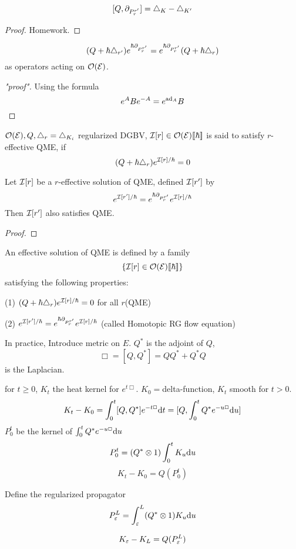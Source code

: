 \begin{lemma}
$$[Q,\partial_{P_r^{r'}}]=\triangle_{K}-\triangle_{K'}$$
\end{lemma}
\begin{proof}
Homework.
\end{proof}

\begin{cor}
$$(Q+\hbar\triangle_{r'})e^{\hbar\partial_{P_r^{r'}}}
=e^{\hbar\partial_{P^{r'}_r}}(Q+\hbar\triangle_r)
$$
as operators acting on $\mathcal{O}(\mathcal{E})$.
\end{cor}
\begin{proof}["proof"]
Using the formula
$$e^ABe^{-A}=e^{\operatorname{ad}_A}B$$
\end{proof}


\begin{definition}
$\mathcal{O}(\mathcal{E}),Q,\triangle_r=\triangle_{K_i}$ regularized DGBV,
$\mathcal{I}[r]\in\mathcal{O}(\mathcal{E})[\![\hbar]\!]$ is said to satisfy
$r$-effective QME, if
$$(Q+\hbar\triangle_r)e^{\mathcal{I}[r]/\hbar}=0$$
\end{definition}
\begin{prop}
Let $\mathcal{I}[r]$ be a $r$-effective solution of QME, defined
$\mathcal{I}[r']$ by
$$e^{\mathcal{I}[r']/\hbar}=e^{\hbar\partial_{P_r^{r'}}}e^{\mathcal{I}[r]/\hbar}$$
Then $\mathcal{I}[r']$ also satisfies QME.
\end{prop}

\begin{proof}
\end{proof}

\begin{definition}
An effective solution of QME is defined by a family
$$\{\mathcal{I}[r]\in\mathcal{O}(\mathcal{E})[\![\hbar]\!]\}$$
satisfying the following properties:

(1) $(Q+\hbar\triangle_r)e^{\mathcal{I}[r]/\hbar}=0$ for all $r$(QME)

(2) $e^{\mathcal{I}[r']/\hbar}=e^{\hbar\partial_{P_r^{r'}}}e^{\mathcal{I}[r]/\hbar}$
(called Homotopic RG flow equation)
\end{definition}

In practice, Introduce metric on $E$. $Q^*$ is the adjoint of $Q$,
$$\Box=[Q,Q^*]=QQ^*+Q^*Q$$
is the Laplacian.

for $t\geq 0$, $K_t$ the heat kernel for $e^{t\Box}$.
$K_0=$delta-function, $K_t$ smooth for $t>0$.
$$K_t-K_0=
\int_0^t[Q,Q^*]e^{-t\Box}\mathrm{d} t
=[Q,\int_0^tQ^*e^{-u\Box}\mathrm{d} u]$$
$P_0^t$ be the kernel of $\int_0^tQ^*e^{-u\Box}\mathrm{d} u$
$$P_0^t=(Q^*\otimes 1)\int_0^tK_u\mathrm{d} u$$
$$K_t-K_0=Q(P_0^t)$$

Define the regularized propagator
$$P_\varepsilon^L=\int_\varepsilon^L(Q^*\otimes 1)K_u\mathrm{d} u$$

$$K_\varepsilon-K_L=Q(P_{\varepsilon}^L)$$








